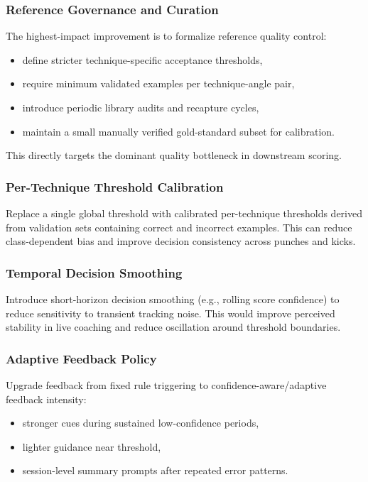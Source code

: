 \documentclass[12pt]{article}
\begin{document}
{\subsubsection{Reference Governance and Curation}

The highest-impact improvement is to formalize reference quality control:

\begin{itemize}
    \item define stricter technique-specific acceptance thresholds,
    \item require minimum validated examples per technique-angle pair,
    \item introduce periodic library audits and recapture cycles,
    \item maintain a small manually verified gold-standard subset for calibration.
\end{itemize}

This directly targets the dominant quality bottleneck in downstream scoring.

\subsubsection{Per-Technique Threshold Calibration}

Replace a single global threshold with calibrated per-technique thresholds derived from validation sets containing correct and incorrect examples. This can reduce class-dependent bias and improve decision consistency across punches and kicks.

\subsubsection{Temporal Decision Smoothing}

Introduce short-horizon decision smoothing (e.g., rolling score confidence) to reduce sensitivity to transient tracking noise. This would improve perceived stability in live coaching and reduce oscillation around threshold boundaries.

\subsubsection{Adaptive Feedback Policy}

Upgrade feedback from fixed rule triggering to confidence-aware/adaptive feedback intensity:

\begin{itemize}
    \item stronger cues during sustained low-confidence periods,
    \item lighter guidance near threshold,
    \item session-level summary prompts after repeated error patterns.
\end{itemize}

}
\end{document}
